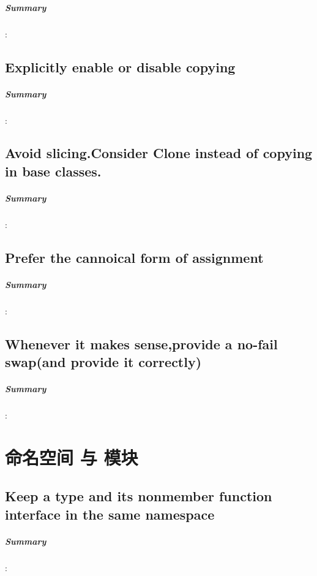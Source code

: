 \documentclass[UTF8,a4paper,12pt]{ctexbook}
\begin{document}
		\paragraph{Summary}:
		
		
	\section{Explicitly enable or disable copying}
		\paragraph{Summary}:
		
		
	\section{Avoid slicing.Consider Clone instead of copying in base classes.}
		\paragraph{Summary}:
		
		
	\section{Prefer the cannoical form of assignment}
		\paragraph{Summary}:
		
		
	\section{Whenever it makes sense,provide a no-fail swap(and provide it correctly)}
		\paragraph{Summary}:
		

\chapter{命名空间 与 模块}
	\section{Keep a type and its nonmember function interface in the same namespace}
		\paragraph{Summary}:
		
\end{document}
